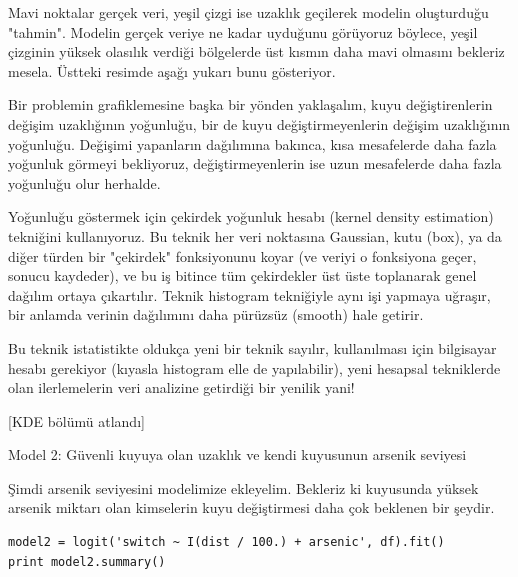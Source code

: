 \documentclass[12pt,fleqn]{article}\usepackage{../../common}
\begin{document}
Mavi noktalar gerçek veri, yeşil çizgi ise uzaklık geçilerek modelin oluşturduğu
"tahmin". Modelin gerçek veriye ne kadar uyduğunu görüyoruz böylece, yeşil
çizginin yüksek olasılık verdiği bölgelerde üst kısmın daha mavi olmasını
bekleriz mesela. Üstteki resimde aşağı yukarı bunu gösteriyor.

Bir problemin grafiklemesine başka bir yönden yaklaşalım, kuyu değiştirenlerin
değişim uzaklığının yoğunluğu, bir de kuyu değiştirmeyenlerin değişim
uzaklığının yoğunluğu. Değişimi yapanların dağılımına bakınca, kısa mesafelerde
daha fazla yoğunluk görmeyi bekliyoruz, değiştirmeyenlerin ise uzun mesafelerde
daha fazla yoğunluğu olur herhalde.

Yoğunluğu göstermek için çekirdek yoğunluk hesabı (kernel density estimation)
tekniğini kullanıyoruz. Bu teknik her veri noktasına Gaussian, kutu (box), ya da
diğer türden bir "çekirdek" fonksiyonunu koyar (ve veriyi o fonksiyona geçer,
sonucu kaydeder), ve bu iş bitince tüm çekirdekler üst üste toplanarak genel
dağılım ortaya çıkartılır. Teknik histogram tekniğiyle aynı işi yapmaya uğraşır,
bir anlamda verinin dağılımını daha pürüzsüz (smooth) hale getirir.

Bu teknik istatistikte oldukça yeni bir teknik sayılır, kullanılması için
bilgisayar hesabı gerekiyor (kıyasla histogram elle de yapılabilir), yeni
hesapsal tekniklerde olan ilerlemelerin veri analizine getirdiği bir yenilik
yani!

[KDE bölümü atlandı]

Model 2: Güvenli kuyuya olan uzaklık ve kendi kuyusunun arsenik seviyesi

Şimdi arsenik seviyesini modelimize ekleyelim. Bekleriz ki kuyusunda yüksek
arsenik miktarı olan kimselerin kuyu değiştirmesi daha çok beklenen bir şeydir.

\begin{verbatim}
model2 = logit('switch ~ I(dist / 100.) + arsenic', df).fit()
print model2.summary()
\end{verbatim}
\end{document}
